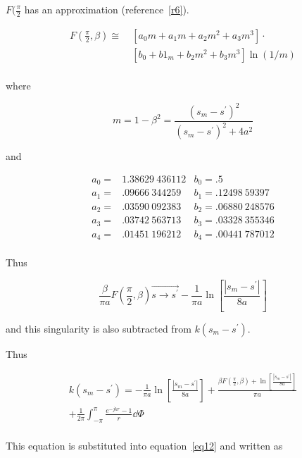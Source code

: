 \documentclass[12pt]{article}
\begin{document}
$F(\frac{\pi}{2}$ has an approximation (reference~\ref{r6}).

\begin{equation}
\begin{aligned}
F\left(\frac{\pi}{2}, \beta\right) \cong\ 
& [a_0m + a_1m + a_2m^2 + a_3m^3] \cdot     \\
& [b_0 + b1_m + b_2m^2 + b_3m^3]\ln(1/m)    \\
\end{aligned}
\label{eq17}
\end{equation}

where

\[
m = 1 - \beta^2 = \frac{(s_m - s^\prime)^2}{(s_m - s^\prime)^2 + 4a^2}
\]

and

\[
\begin{array}{lrl}
a_0 = & 1.38629\ 436112 & b_0 = .5            \\
a_1 = &  .09666\ 344259 & b_1 = .12498\ 59397  \\
a_2 = &  .03590\ 092383 & b_2 = .06880\ 248576 \\
a_3 = &  .03742\ 563713 & b_3 = .03328\ 355346 \\
a_4 = &  .01451\ 196212 & b_4 = .00441\ 787012 \\
\end{array}
\]

Thus

\begin{equation}
\frac{\beta}{\pi a}F\left(\frac{\pi}{2},\beta\right)
\overrightarrow{s\rightarrow s^\prime}
-\frac{1}{\pi a}\ln\left[\frac{|s_m - s^\prime|}{8a}\right]
\label{eq18}
\end{equation}

and this singularity is also subtracted from $k(s_m-s^\prime)$.

Thus

\begin{equation}
\begin{gathered}
k(s_m - s^\prime) = -\frac{1}{\pi a}\ln \left[\frac{|s_m - s^\prime|}{8a}\right]
+\frac{\beta F(\frac{\pi}{2}, \beta)
      + \ln\left[\frac{|s_m - s^\prime|}{8a}\right]}{\pi a}  \\
+ \frac{1}{2\pi}\int_{-\pi}^\pi\frac{e^{-jkr}-1}{r}\dd{\Phi} \\
\end{gathered}
\label{eq19}
\end{equation}

This equation is substituted into equation~\eqref{eq12} and written as
\end{document}
